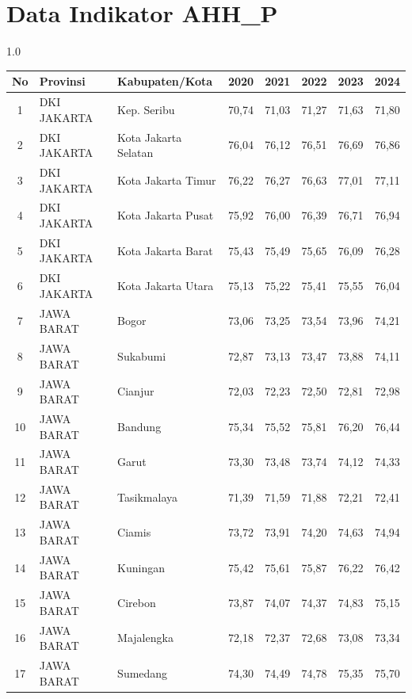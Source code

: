 \section*{Data Indikator AHH\_P}
\begin{spacing}{1.0}
\scriptsize
\setlength{\tabcolsep}{2pt}
\begin{longtable}{|c|p{2.2cm}|p{2.8cm}|c|c|c|c|c|}
\hline
\textbf{No} & \textbf{Provinsi} & \textbf{Kabupaten/Kota} & \textbf{2020} & \textbf{2021} & \textbf{2022} & \textbf{2023} & \textbf{2024} \\ \hline
\endhead
1 & DKI JAKARTA & Kep. Seribu & 70,74 & 71,03 & 71,27 & 71,63 & 71,80 \\ \hline
2 & DKI JAKARTA & Kota Jakarta Selatan & 76,04 & 76,12 & 76,51 & 76,69 & 76,86 \\ \hline
3 & DKI JAKARTA & Kota Jakarta Timur & 76,22 & 76,27 & 76,63 & 77,01 & 77,11 \\ \hline
4 & DKI JAKARTA & Kota Jakarta Pusat & 75,92 & 76,00 & 76,39 & 76,71 & 76,94 \\ \hline
5 & DKI JAKARTA & Kota Jakarta Barat & 75,43 & 75,49 & 75,65 & 76,09 & 76,28 \\ \hline
6 & DKI JAKARTA & Kota Jakarta Utara & 75,13 & 75,22 & 75,41 & 75,55 & 76,04 \\ \hline
7 & JAWA BARAT & Bogor & 73,06 & 73,25 & 73,54 & 73,96 & 74,21 \\ \hline
8 & JAWA BARAT & Sukabumi & 72,87 & 73,13 & 73,47 & 73,88 & 74,11 \\ \hline
9 & JAWA BARAT & Cianjur & 72,03 & 72,23 & 72,50 & 72,81 & 72,98 \\ \hline
10 & JAWA BARAT & Bandung & 75,34 & 75,52 & 75,81 & 76,20 & 76,44 \\ \hline
11 & JAWA BARAT & Garut & 73,30 & 73,48 & 73,74 & 74,12 & 74,33 \\ \hline
12 & JAWA BARAT & Tasikmalaya & 71,39 & 71,59 & 71,88 & 72,21 & 72,41 \\ \hline
13 & JAWA BARAT & Ciamis & 73,72 & 73,91 & 74,20 & 74,63 & 74,94 \\ \hline
14 & JAWA BARAT & Kuningan & 75,42 & 75,61 & 75,87 & 76,22 & 76,42 \\ \hline
15 & JAWA BARAT & Cirebon & 73,87 & 74,07 & 74,37 & 74,83 & 75,15 \\ \hline
16 & JAWA BARAT & Majalengka & 72,18 & 72,37 & 72,68 & 73,08 & 73,34 \\ \hline
17 & JAWA BARAT & Sumedang & 74,30 & 74,49 & 74,78 & 75,35 & 75,70 \\ \hline

\end{longtable}
\end{spacing}

